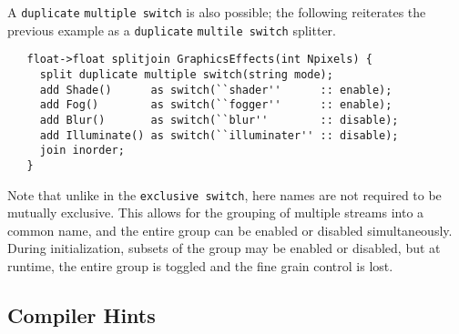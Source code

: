 \documentclass{tr}
\begin{document}
A  \texttt{duplicate} \texttt{multiple switch}  is also  possible; the
following  reiterates  the previous  example  as a  \texttt{duplicate}
\texttt{multile switch} splitter.
\begin{verbatim}
   float->float splitjoin GraphicsEffects(int Npixels) {
     split duplicate multiple switch(string mode);
     add Shade()      as switch(``shader''      :: enable);
     add Fog()        as switch(``fogger''      :: enable);
     add Blur()       as switch(``blur''        :: disable);
     add Illuminate() as switch(``illuminater'' :: disable);
     join inorder;
   }
\end{verbatim}

Note that unlike in the  \texttt{exclusive switch}, here names are not
required to  be mutually  exclusive. This allows  for the  grouping of
multiple  streams into  a common  name, and  the entire  group  can be
enabled or disabled  simultaneously. During initialization, subsets of
the group may be enabled or disabled, but at runtime, the entire group
is toggled and the fine grain control is lost.





\subsection{Compiler Hints}
\end{document}
